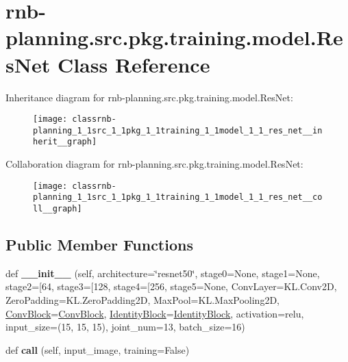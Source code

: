 \hypertarget{classrnb-planning_1_1src_1_1pkg_1_1training_1_1model_1_1_res_net}{}\section{rnb-\/planning.src.\+pkg.\+training.\+model.\+Res\+Net Class Reference}
\label{classrnb-planning_1_1src_1_1pkg_1_1training_1_1model_1_1_res_net}


Inheritance diagram for rnb-\/planning.src.\+pkg.\+training.\+model.\+Res\+Net\+:
\nopagebreak
\begin{figure}[H]
\begin{center}
\leavevmode
\texttt{[image: classrnb-planning\_1\_1src\_1\_1pkg\_1\_1training\_1\_1model\_1\_1\_res\_net\_\_inherit\_\_graph]}
\end{center}
\end{figure}


Collaboration diagram for rnb-\/planning.src.\+pkg.\+training.\+model.\+Res\+Net\+:
\nopagebreak
\begin{figure}[H]
\begin{center}
\leavevmode
\texttt{[image: classrnb-planning\_1\_1src\_1\_1pkg\_1\_1training\_1\_1model\_1\_1\_res\_net\_\_coll\_\_graph]}
\end{center}
\end{figure}
\subsection*{Public Member Functions}
\begin{DoxyCompactItemize}
\item 
\mbox{\label{classrnb-planning_1_1src_1_1pkg_1_1training_1_1model_1_1_res_net_ab44058646b114a445882de74cda17570}} 
def {\bfseries \+\_\+\+\_\+init\+\_\+\+\_\+} (self, architecture=\char`\"{}resnet50\char`\"{}, stage0=None, stage1=None, stage2=\mbox{[}64, stage3=\mbox{[}128, stage4=\mbox{[}256, stage5=None, Conv\+Layer=K\+L.\+Conv2D, Zero\+Padding=K\+L.\+Zero\+Padding2D, Max\+Pool=K\+L.\+Max\+Pooling2D, \hyperlink{classrnb-planning_1_1src_1_1pkg_1_1training_1_1model_1_1_conv_block}{Conv\+Block}=\hyperlink{classrnb-planning_1_1src_1_1pkg_1_1training_1_1model_1_1_conv_block}{Conv\+Block}, \hyperlink{classrnb-planning_1_1src_1_1pkg_1_1training_1_1model_1_1_identity_block}{Identity\+Block}=\hyperlink{classrnb-planning_1_1src_1_1pkg_1_1training_1_1model_1_1_identity_block}{Identity\+Block}, activation=\textquotesingle{}relu\textquotesingle{}, input\+\_\+size=(15, 15, 15), joint\+\_\+num=13, batch\+\_\+size=16)
\item 
\mbox{\label{classrnb-planning_1_1src_1_1pkg_1_1training_1_1model_1_1_res_net_a922cf8753ea6f756ecb1de684852d84e}} 
def {\bfseries call} (self, input\+\_\+image, training=False)
\end{DoxyCompactItemize}
